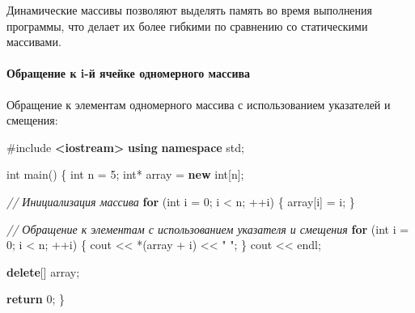 \documentclass[
]{article}
\newenvironment{Shaded}{}{}
\newcommand{\CommentTok}[1]{\textcolor[rgb]{0.38,0.63,0.69}{\textit{#1}}}
\newcommand{\ControlFlowTok}[1]{\textcolor[rgb]{0.00,0.44,0.13}{\textbf{#1}}}
\newcommand{\DataTypeTok}[1]{\textcolor[rgb]{0.56,0.13,0.00}{#1}}
\newcommand{\DecValTok}[1]{\textcolor[rgb]{0.25,0.63,0.44}{#1}}
\newcommand{\ImportTok}[1]{\textcolor[rgb]{0.00,0.50,0.00}{\textbf{#1}}}
\newcommand{\KeywordTok}[1]{\textcolor[rgb]{0.00,0.44,0.13}{\textbf{#1}}}
\newcommand{\NormalTok}[1]{#1}
\newcommand{\OperatorTok}[1]{\textcolor[rgb]{0.40,0.40,0.40}{#1}}
\newcommand{\PreprocessorTok}[1]{\textcolor[rgb]{0.74,0.48,0.00}{#1}}
\newcommand{\StringTok}[1]{\textcolor[rgb]{0.25,0.44,0.63}{#1}}
\begin{document}
Динамические массивы позволяют выделять память во время выполнения
программы, что делает их более гибкими по сравнению со статическими
массивами.

\paragraph{Обращение к i-й ячейке одномерного
массива}\label{ux43eux431ux440ux430ux449ux435ux43dux438ux435-ux43a-i-ux439-ux44fux447ux435ux439ux43aux435-ux43eux434ux43dux43eux43cux435ux440ux43dux43eux433ux43e-ux43cux430ux441ux441ux438ux432ux430}

Обращение к элементам одномерного массива с использованием указателей и
смещения:

\begin{Shaded}
\begin{Highlighting}[]
\PreprocessorTok{\#include }\ImportTok{\textless{}iostream\textgreater{}}
\KeywordTok{using} \KeywordTok{namespace}\NormalTok{ std}\OperatorTok{;}

\DataTypeTok{int}\NormalTok{ main}\OperatorTok{()} \OperatorTok{\{}
    \DataTypeTok{int}\NormalTok{ n }\OperatorTok{=} \DecValTok{5}\OperatorTok{;}
    \DataTypeTok{int}\OperatorTok{*}\NormalTok{ array }\OperatorTok{=} \KeywordTok{new} \DataTypeTok{int}\OperatorTok{[}\NormalTok{n}\OperatorTok{];}

    \CommentTok{// Инициализация массива}
    \ControlFlowTok{for} \OperatorTok{(}\DataTypeTok{int}\NormalTok{ i }\OperatorTok{=} \DecValTok{0}\OperatorTok{;}\NormalTok{ i }\OperatorTok{\textless{}}\NormalTok{ n}\OperatorTok{;} \OperatorTok{++}\NormalTok{i}\OperatorTok{)} \OperatorTok{\{}
\NormalTok{        array}\OperatorTok{[}\NormalTok{i}\OperatorTok{]} \OperatorTok{=}\NormalTok{ i}\OperatorTok{;}
    \OperatorTok{\}}

    \CommentTok{// Обращение к элементам с использованием указателя и смещения}
    \ControlFlowTok{for} \OperatorTok{(}\DataTypeTok{int}\NormalTok{ i }\OperatorTok{=} \DecValTok{0}\OperatorTok{;}\NormalTok{ i }\OperatorTok{\textless{}}\NormalTok{ n}\OperatorTok{;} \OperatorTok{++}\NormalTok{i}\OperatorTok{)} \OperatorTok{\{}
\NormalTok{        cout }\OperatorTok{\textless{}\textless{}} \OperatorTok{*(}\NormalTok{array }\OperatorTok{+}\NormalTok{ i}\OperatorTok{)} \OperatorTok{\textless{}\textless{}} \StringTok{" "}\OperatorTok{;}
    \OperatorTok{\}}
\NormalTok{    cout }\OperatorTok{\textless{}\textless{}}\NormalTok{ endl}\OperatorTok{;}

    \KeywordTok{delete}\OperatorTok{[]}\NormalTok{ array}\OperatorTok{;}

    \ControlFlowTok{return} \DecValTok{0}\OperatorTok{;}
\OperatorTok{\}}
\end{Highlighting}
\end{Shaded}
\end{document}
